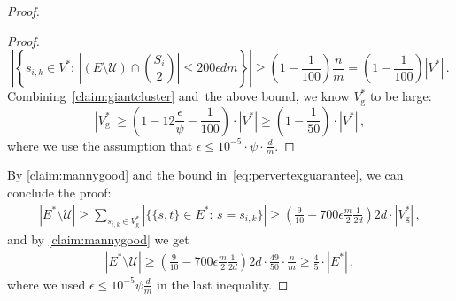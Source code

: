 \documentclass[epsfig,letter,11pt]{article}
\numberwithin{equation}{section}
\DeclareMathOperator*{\good}{g}
\begin{document}
\begin{proof}
\begin{proof}
\begin{equation}
			\left|\left\{s_{i,k} \in V^* : \, \left|(E \setminus \mathcal{U}) \cap \binom{S_i}{2}\right| \le {200\epsilon}dm \right\}\right| \ge \left(1-\frac{1}{100}\right)\frac{n}{m}= \left(1-\frac{1}{100}\right)|V^*| \, .
		\end{equation}
		Combining~\cref{claim:giantcluster} and~the above bound, we know $V^*_{\good}$ to be large:
		\begin{equation*}
			|V^*_{\text{g}}| \ge \left(1-12\frac{\epsilon}{\psi}-\frac{1}{100}\right) \cdot |V^*| \ge \left(1-\frac{1}{50}\right) \cdot |V^*| \, ,
		\end{equation*}
		where we use the assumption that $\epsilon \le 10^{-5} \cdot \psi \cdot \frac{d}{m}$.
	\end{proof}
\noindent
	By \cref{claim:mannygood} and the bound in~\eqref{eq:pervertexguarantee}, we can conclude the proof:
	\begin{align*}
		|E^*  \setminus \mathcal{U}| \ge \sum_{s_{i,k} \in V^*_{\text{g}}} |\{\{s,t\} \in E^* : \, s = s_{i,k}\}|   \ge   \left(\frac{9}{10} - 700{\epsilon} \frac{m}{2}\frac{1}{2d}\right)2d \cdot |V^*_{\text{g}}| \, ,
	\end{align*}
	and by \cref{claim:mannygood} we get
	\begin{align*}
	|E^*  \setminus \mathcal{U}|  \ge  \left(\frac{9}{10} - 700{\epsilon}\frac{m}{2}\frac{1}{2d}\right)2d \cdot \frac{49}{50} \cdot \frac{n}{m}  \ge \frac{4}{5} \cdot |E^*|  \, ,
	\end{align*}
	where we used $\epsilon \le 10^{-5} \psi \frac{d}{m}$ in the last inequality.
\end{proof}
\end{document}
